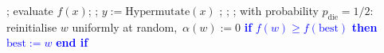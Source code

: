 \documentclass[lettersize,journal]{IEEEtran}
\newcommand{\rev}[1]{\textcolor{blue}{#1}}
\begin{document}
 	
\begin{algorithm}[t] 
 	    \caption{$(1+1)$~Opt-IA$_{\textsc{LastBest}}$ }
     \begin{algorithmic}[1]  ;      
 	           \STATE evaluate $f(x)$;    
 	             ;
\STATE $y:=\text{Hypermutate}(x)$
 	            ;
 	            \ELSE
 	            ;
 	            \ENDIF
 	            ;
 	           \ENDIF
{}
 	            \STATE with probability $p_{\text{die}}=1/2$:
 	            \STATE \hspace{\algorithmicindent}
 	            reinitialise $w$ uniformly at random,\ $\alpha(w):=0$
 	            \textcolor{blue}{\STATE \hspace{\algorithmicindent}
 	            	\textbf{if} $f(w) \geq f(\text{best})$ \textbf{then}
 	            	\STATE \hspace{2\algorithmicindent}
 	            	$\text{best}:=w$
 	            	\STATE \hspace{\algorithmicindent}
 	            	\textbf{end if}}
 	            \ENDIF
 	            \ENDFOR
 	         \rev{   
 	            \ENDIF}
\ENDWHILE
 	   \end{algorithmic} \label{alg:alg1+ageing}
 	\end{algorithm}
\end{document}
